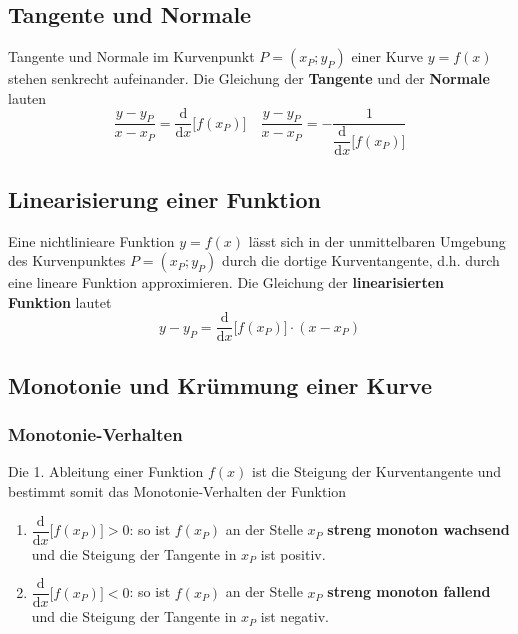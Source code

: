 \subsection{Tangente und Normale}
Tangente und Normale im Kurvenpunkt $P=\left(x_P;y_P\right)$ einer Kurve $y=f\left(x\right)$ stehen senkrecht aufeinander. Die Gleichung der \textbf{Tangente} und der \textbf{Normale} lauten
\begin{equation}
\boxed{\dfrac{y-y_P}{x-x_P}=\dfrac{\text{d}}{\text{d}x}\Big[f\left(x_P\right)\Big]}\quad \boxed{\dfrac{y-y_P}{x-x_P}=-\dfrac{1}{\dfrac{\text{d}}{\text{d}x}\Big[f\left(x_P\right)\Big]}}
\end{equation}
\subsection{Linearisierung einer Funktion}
Eine nichtlinieare Funktion $y=f\left(x\right)$ lässt sich in der unmittelbaren Umgebung des Kurvenpunktes $P=\left(x_P;y_P\right)$ durch die dortige Kurventangente, d.h. durch eine lineare Funktion approximieren. Die Gleichung der \textbf{linearisierten Funktion} lautet
\begin{equation}
\boxed{y-y_P=\dfrac{\text{d}}{\text{d}x}\Big[f\left(x_P\right)\Big]\cdot \left(x-x_P\right)}
\end{equation}
\subsection{Monotonie und Krümmung einer Kurve}
\subsubsection{Monotonie-Verhalten}
Die 1. Ableitung einer Funktion $f\left(x\right)$ ist die Steigung der Kurventangente und bestimmt somit das Monotonie-Verhalten der Funktion
\begin{enumerate}[$(a)$]
\item $\dfrac{\text{d}}{\text{d}x}\Big[f\left(x_P\right)\Big]>0$: so ist $f\left(x_P\right)$ an der Stelle $x_P$ \textbf{streng monoton wachsend} und die Steigung der Tangente in $x_P$ ist positiv.
\item $\dfrac{\text{d}}{\text{d}x}\Big[f\left(x_P\right)\Big]<0$: so ist $f\left(x_P\right)$ an der Stelle $x_P$ \textbf{streng monoton fallend} und die Steigung der Tangente in $x_P$ ist negativ.
\end{enumerate}
